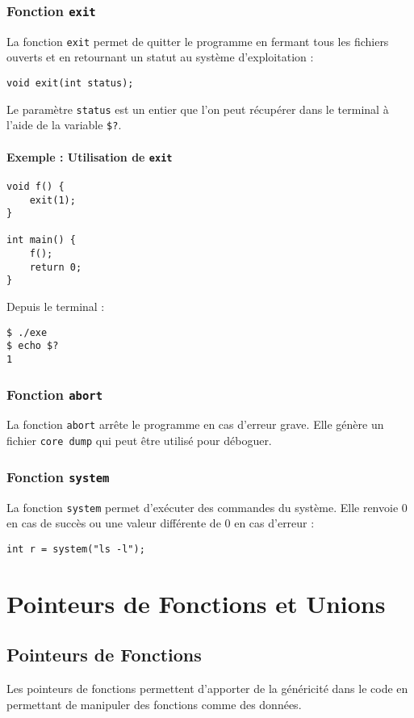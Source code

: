 \documentclass[french,11pt]{article}
\begin{document}
\subsubsection{Fonction \texttt{exit}}
La fonction \texttt{exit} permet de quitter le programme en fermant tous les fichiers ouverts et en retournant un statut au système d'exploitation :
\begin{verbatim}
void exit(int status);
\end{verbatim}
Le paramètre \texttt{status} est un entier que l'on peut récupérer dans le terminal à l'aide de la variable \texttt{\$?}.

\paragraph{Exemple : Utilisation de \texttt{exit}}
\begin{verbatim}
void f() {
    exit(1);
}

int main() {
    f();
    return 0;
}
\end{verbatim}
Depuis le terminal :
\begin{verbatim}
$ ./exe
$ echo $?
1
\end{verbatim}

\subsubsection{Fonction \texttt{abort}}
La fonction \texttt{abort} arrête le programme en cas d'erreur grave. Elle génère un fichier \texttt{core dump} qui peut être utilisé pour déboguer.

\subsubsection{Fonction \texttt{system}}
La fonction \texttt{system} permet d'exécuter des commandes du système. Elle renvoie 0 en cas de succès ou une valeur différente de 0 en cas d'erreur :
\begin{verbatim}
int r = system("ls -l");
\end{verbatim}
\section{Pointeurs de Fonctions et Unions}

\subsection{Pointeurs de Fonctions}
Les pointeurs de fonctions permettent d'apporter de la généricité dans le code en permettant de manipuler des fonctions comme des données.
\end{document}
